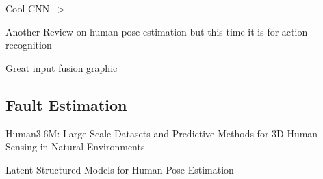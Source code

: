 Cool CNN --> \cite{ElboushakiAbdessamad2020MAmf}

Another Review on human pose estimation but this time it is for action recognition \cite{ReviewHPEforActionRecognition}

Great input fusion graphic \cite{ActionRecognitionHPEFusion}

\subsection{Fault Estimation}

Human3.6M: Large Scale Datasets and Predictive Methods for 3D Human Sensing in Natural Environments \cite{h36m_pami}


Latent Structured Models for Human Pose Estimation \cite{IonescuSminchisescu11} 
